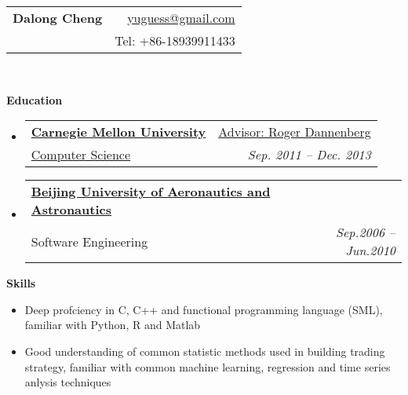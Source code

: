 \documentclass[letterpaper,11pt]{article}
\makeatletter
\newcommand{\resheading}[1]{{\large \colorbox{mygrey}{\begin{minipage}{\textwidth}{\textbf{#1 \vphantom{p\^{E}}}}\end{minipage}}}}
\newcommand{\ressubheading}[4]{
\begin{tabular*}{6.5in}{l@{\extracolsep{\fill}}r}
		\textbf{#1} & #2 \\
		{#3}{} & \textit{#4} \\
\end{tabular*}\vspace{-6pt}}
\makeatother
\begin{document}
\newcommand{\mywebheader}{
\begin{tabular*}{7in}{l@{\extracolsep{\fill}}r}
	\textbf{\LARGE Dalong Cheng} & \href{mailto:yuguess@gmail.com}{yuguess@gmail.com}\\
	{\footnotesize \texttt{}} & {Tel: +86-18939911433} \\
	\end{tabular*}
\\
\vspace{0.1in}}

\mywebheader

\resheading{Education}
  \begin{itemize}
		\item
      \ressubheading{\href{http://www.cmu.edu}
      {Carnegie Mellon University}}
      {\href{http://www.cs.cmu.edu/\~rbd}{Advisor: Roger Dannenberg}} 
      {\href{http://www.cs.cmu.edu/~music/mat/}{Computer Science}{}}
      {Sep. 2011 -- Dec. 2013}

    \item	
      \ressubheading{\href{http://ev.buaa.edu.cn}
      {Beijing University of Aeronautics and Astronautics}}
      {}{Software Engineering}{Sep.2006 -- Jun.2010}

	\end{itemize}

\resheading{{Skills}}
  \begin{itemize}
		\item{\small Deep profciency in C, C++ and 
    functional programming language (SML), familiar with Python, R and Matlab}

		\item{\small Good understanding of common statistic methods used in building trading strategy, familiar with 
    common machine learning, regression and time series anlysis techniques}
	\end{itemize}
\end{document}
